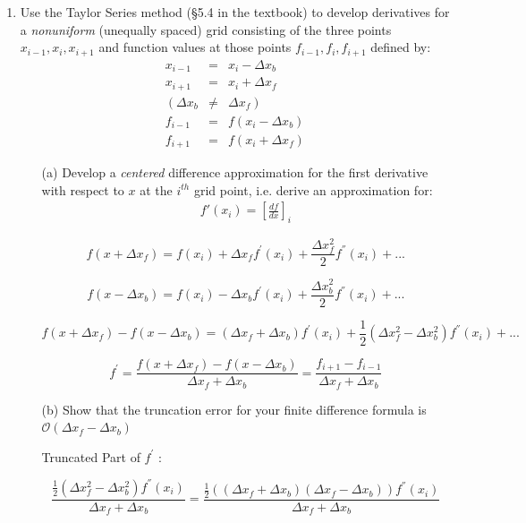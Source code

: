 \documentclass{article}
\begin{document}
\begin{enumerate}
  \item Use the Taylor Series method (\S 5.4 in the textbook) to develop derivatives for a \emph{nonuniform} (unequally spaced) grid consisting of the three points $x_{i-1},x_i,x_{i+1}$ and function values at those points $f_{i-1},f_i,f_{i+1}$ defined by:
    \begin{eqnarray}
      x_{i-1} &=& x_i - \Delta x_b \\
      x_{i+1} &=& x_i + \Delta x_f \\
      \left( \Delta x_b \right. &\ne& \left. \Delta x_f \right) \\
      f_{i-1} &=& f(x_i - \Delta x_b) \\ 
      f_{i+1} &=& f(x_i + \Delta x_f)     
    \end{eqnarray}
    
    \bigbreak
    
    \begin{itemize}
      \item[(a)]  Develop a \emph{centered} difference approximation for the first derivative with respect to $x$ at the $i^{th}$ grid point, i.e. derive an approximation for:
      \begin{eqnarray}
      f'(x_i) = \left[ \frac{d f}{d x} \right]_i
      \end{eqnarray}
  
    $$f(x + \Delta x_f) = f(x_i) + \Delta x_f f^{'}(x_i) + \frac{\Delta x^{2}_f}{2} f^{''} (x_i) + ... $$
    
    $$f(x - \Delta x_b) = f(x_i) - \Delta x_b f^{'}(x_i) + \frac{\Delta x^{2}_b}{2} f^{''} (x_i) + ... $$
    
    $$f(x + \Delta x_f) - f(x - \Delta x_b) = (\Delta x_f + \Delta x_b)f^{'}(x_i) + \frac{1}{2} (\Delta x^{2}_f - \Delta x^{2}_b)f^{''}(x_i) + ...$$
    
    $$\boxed{f^{'} = \frac{f(x + \Delta x_f) - f(x - \Delta x_b)}{\Delta x_f + \Delta x_b} = \frac{f_{i+1} - f_{i-1}}{\Delta x_f + \Delta x_b}}$$
    
    \bigskip
    \bigskip
    
    \item[(b)]  Show that the truncation error for your finite difference formula is $\mathcal{O}(\Delta x_f - \Delta x_b)$
    
    Truncated Part of $f^{'}$ :
    
    $$\frac{\frac{1}{2} (\Delta x^{2}_f - \Delta x^{2}_b)f^{''} (x_i)}{\Delta x_f + \Delta x_b} = \frac{\frac{1}{2} ((\Delta x_f + \Delta x_b)(\Delta x_f - \Delta x_b))f^{''} (x_i)}{\Delta x_f + \Delta x_b}$$
    

\end{itemize}
\end{enumerate}
\end{document}
